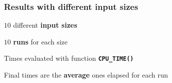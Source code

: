 \documentclass[10pt,externalviewer]{beamer}
\begin{document}
\begin{frame}
   \frametitle{Results with different input sizes}

   \begin{minipage}{0.45\textwidth}

      \vspace{0.25cm}

      \begin{itemize}
         \small{\item $10$ different \textcolor{BrickRed}{\textbf{input sizes}}}
         \small{\item $10$ \textcolor{BrickRed}{\textbf{runs}} for each size}
         \small{\item Times evaluated with function \textcolor{BrickRed}{\texttt{\textbf{CPU\_TIME()}}}}
         \small{\item Final times are the \textcolor{BrickRed}{\textbf{average}} ones elapsed for each run}
      \end{itemize}


\end{minipage}
\end{frame}
\end{document}
